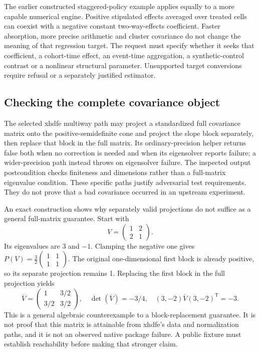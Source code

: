 The earlier constructed staggered-policy example applies equally to a more
capable numerical engine. Positive stipulated effects averaged over treated
cells can coexist with a negative constant two-way-effects coefficient.
Faster absorption, more precise arithmetic and cluster covariance do not
change the meaning of that regression target. The request must specify
whether it seeks that coefficient, a cohort-time effect, an event-time
aggregation, a synthetic-control contrast or a nonlinear structural
parameter. Unsupported target conversions require refusal or a separately
justified estimator.~\citep{exec25_paneljava_reference,exec25_panelcxx_reference}

\subsection{Checking the complete covariance object}
The selected xhdfe multiway path may project a standardized full covariance
matrix onto the positive-semidefinite cone and project the slope block
separately, then replace that block in the full matrix. Its ordinary-precision
helper returns false both when no correction is needed and when its
eigensolver reports failure; a wider-precision path instead throws on
eigensolver failure. The inspected output postcondition checks finiteness
and dimensions rather than a full-matrix eigenvalue condition. These
specific paths justify adversarial test requirements. They do not prove
that a bad covariance occurred in an upstream experiment.
\citep{exec25_panelcxx_xhdfe}

An exact construction shows why separately valid projections do not suffice
as a general full-matrix guarantee. Start with
\[
V=\begin{pmatrix}1&2\\2&1\end{pmatrix}.
\]
Its eigenvalues are 3 and $-1$. Clamping the negative one gives
$P(V)=\tfrac32\begin{pmatrix}1&1\\1&1\end{pmatrix}$. The original
one-dimensional first block is already positive, so its separate projection
remains 1. Replacing the first block in the full projection yields
\[
\overline V=\begin{pmatrix}1&3/2\\3/2&3/2\end{pmatrix},
\quad\det(\overline V)=-3/4,
\quad (3,-2)\overline V(3,-2)^\mathsf{T}=-3.
\]
This is a general algebraic counterexample to a block-replacement guarantee.
It is not proof that this matrix is attainable from xhdfe's data and
normalization paths, and it is not an observed native package failure.
A public fixture must establish reachability before making that stronger
claim.~\citep{exec25_panelcxx_reference}

